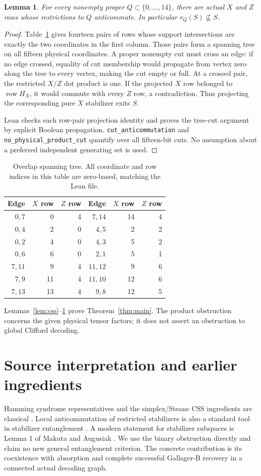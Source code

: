 \documentclass[11pt]{article}
\newtheorem{lemma}[theorem]{Lemma}
\newcommand{\row}{\operatorname{row}}
\begin{document}
\begin{lemma}\label{lem:cut}
For every nonempty proper $Q\subset\{0,\ldots,14\}$, there are actual
$X$ and $Z$ rows whose restrictions to $Q$ anticommute. In particular
$r_Q(S)\not\subseteq S$.
\end{lemma}
\begin{proof}
Table~\ref{tab:tree} gives fourteen pairs of rows whose support intersections
are exactly the two coordinates in the first column. Those pairs form a
spanning tree on all fifteen physical coordinates. A proper nonempty cut
must cross an edge: if no edge crossed, equality of cut membership would
propagate from vertex zero along the tree to every vertex, making the cut
empty or full. At a crossed pair, the restricted $X/Z$ dot product is one.
If the projected $X$ row belonged to $\row H_X$, it would commute with
every $Z$ row, a contradiction. Thus projecting the corresponding pure
$X$ stabilizer exits $S$.

Lean checks each row-pair projection identity and proves the tree-cut
argument by explicit Boolean propagation. \texttt{cut\_anticommutation}
and \texttt{no\_physical\_product\_cut} quantify over all fifteen-bit cuts.
No assumption about a preferred independent generating set is used.
\end{proof}
\begin{table}[ht]\centering\small
\begin{tabular}{rrr@{\qquad}rrr}
\toprule Edge & $X$ row & $Z$ row & Edge & $X$ row & $Z$ row\\\midrule
$0,7$&0&4&$7,14$&14&4\\
$0,4$&2&0&$4,5$&2&2\\
$0,2$&4&0&$4,3$&5&2\\
$0,6$&6&0&$2,1$&5&1\\
$7,11$&9&4&$11,12$&9&6\\
$7,9$&11&4&$11,10$&12&6\\
$7,13$&13&4&$9,8$&12&5\\\bottomrule
\end{tabular}
\caption{Overlap spanning tree. All coordinate and row indices in this
table are zero-based, matching the Lean file.}\label{tab:tree}
\end{table}
Lemmas~\ref{lem:css}--\ref{lem:cut} prove Theorem~\ref{thm:main}.
The product obstruction concerns the given physical tensor factors; it does
not assert an obstruction to global Clifford decoding.

\section{Source interpretation and earlier ingredients}
Hamming syndrome representatives and the simplex/Steane CSS ingredients
are classical \cite{hamming,steane}. Local anticommutation of restricted
stabilizers is also a standard tool in stabilizer entanglement
\cite{fattal}. A modern statement for stabilizer subspaces is Lemma 1 of
Makuta and Augusiak \cite{makuta}. We use the binary obstruction directly
and claim no new general entanglement criterion. The concrete contribution
is its coexistence with absorption and complete successful Gallager-B
recovery in a connected actual decoding graph.
\end{document}

